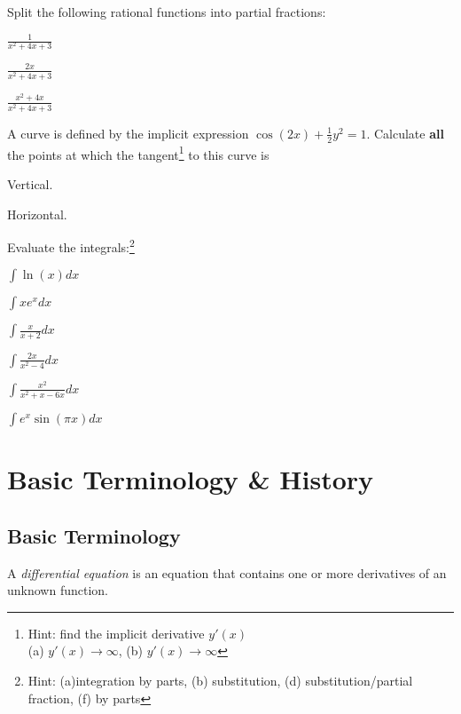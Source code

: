 \begin{question}
    Split the following rational functions into partial fractions:
    \begin{colenumerate}[3]
    \item \(\frac{1}{x^{2} + 4x + 3}\)
    \item \(\frac{2x}{x^{2} + 4x + 3}\)
    \item \(\frac{x^{2}+4x}{x^{2} + 4x + 3}\)
    \end{colenumerate}
    \solspace{0.5in}
\end{question}
  

\begin{question}
    A curve is defined by the implicit expression
    \(
      \cos(2x) + \frac{1}{2}y^{2} = 1.
    \)
    Calculate \textbf{all} the points at which the tangent\footnote{Hint: find the implicit derivative \(y'(x)\)\\ (a) \(y'(x)\to \infty\), (b) \(y'(x)\to \infty\)} to this curve is
    \begin{colenumerate}
      \item Vertical.  \item Horizontal.
    \end{colenumerate}
    \solspace{0.5in}
\end{question}

\begin{question}
    Evaluate the integrals:\footnote{Hint: (a)integration by parts, (b) substitution, (d) substitution/partial fraction, (f) by parts} 
    \begin{colenumerate}[3]
    \item \(\int \ln(x) dx\)
    \item \(\int x e^{x} dx\)
    \item \(\int \frac{x}{x+2} dx\)
    \item \(\int \frac{2x}{x^{2}-4} dx\)
    \item \(\int \frac{x^{2}}{x^{2}+x-6x}dx\)
    \item \(\int e^{x}\sin(\pi x)dx\)
    \end{colenumerate}
    \solspace{0.5in}
\end{question}


\section{Basic Terminology \& History}
\subsection{Basic Terminology}
\begin{definition}
       A \emph{differential equation}  is an equation that contains one or more derivatives of an unknown function. 
\end{definition}

